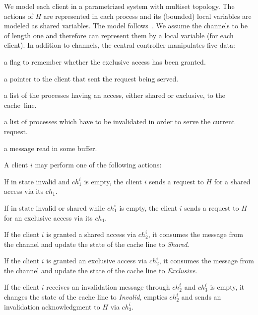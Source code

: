 We model each client in a parametrized system with multiset topology.
The actions of $H$ are represented in each process and its (bounded)
local variables are modeled as shared variables. The model
follows~\cite{PRZ-tacas01}. We assume the channels to be of length one
and therefore can represent them by a local variable (for each
client).  In addition to channels, the central controller manipulates
five data:
\begin{description}[leftmargin=6em,style=nextline,align=right,labelsep=\parindent]
\item[\color{blue} excl] a flag to remember whether the exclusive access has been granted.%
\item[\color{blue} ctl] a pointer to the client that sent the request being served.%
\item[\color{blue} sh\_list] a list of the processes having an access, either shared or exclusive, to the cache~line. %
\item[\color{blue} inv\_list] a list of  processes which have to be invalidated in order to serve the current request.%
\item[\color{blue} cmd] a message read in some buffer.%
\end{description}%

A client $i$ may perform one of the following actions:
\begin{description}[leftmargin=6em,style=nextline,align=right,labelsep=\parindent]
\item[\color{orange} $c_1$] If in state invalid and $ch_1^i$ is empty, the client $i$ sends a request to $H$
  for a shared access via its $ch_1$.
\item[\color{orange} $c_2$] If in state invalid or shared while $ch_1^i$ is empty, the client $i$ sends 
  a request to $H$ for an exclusive access via its $ch_1$.
\item[\color{orange} $c_3$] If the client $i$ is granted a shared access via $ch_2^i$,
  it consumes the message from the channel and update the state of the
  cache line to \emph{Shared}. 
\item[\color{orange} $c_4$] If the client $i$ is granted an exclusive access via $ch_2^i$,
  it consumes the message from the channel and update the state of the
  cache line to \emph{Exclusive}.
\item[\color{orange} $c_5$] If the client $i$ receives an invalidation message through
  $ch_2^i$ and $ch_3^i$ is empty, it changes the state of the cache
  line to \emph{Invalid}, empties $ch_2^i$ and sends an invalidation
  acknowledgment to $H$ via $ch_3^i$.
\end{description}

